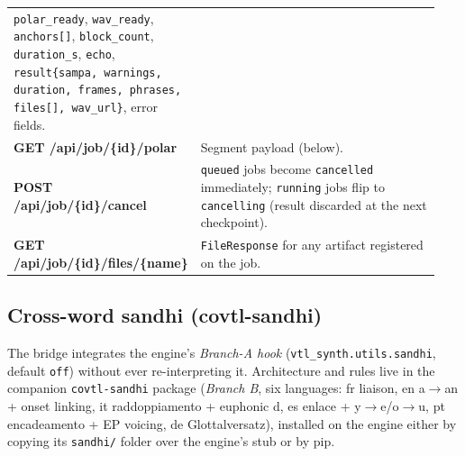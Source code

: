\documentclass[11pt,a4paper]{article}
\begin{document}
\begin{longtable}{p{0.30\linewidth}p{0.64\linewidth}}
\texttt{polar\_ready}, \texttt{wav\_ready}, \texttt{anchors[]},
\texttt{block\_count}, \texttt{duration\_s}, \texttt{echo},
\texttt{result\{sampa, warnings, duration, frames, phrases, files[],
wav\_url\}}, error fields. \\
\textbf{GET /api/job/\{id\}/polar} & Segment payload (below). \\
\textbf{POST /api/job/\{id\}/cancel} & \texttt{queued} jobs become
\texttt{cancelled} immediately; \texttt{running} jobs flip to
\texttt{cancelling} (result discarded at the next checkpoint). \\
\textbf{GET /api/job/\{id\}/files/\{name\}} & \texttt{FileResponse} for
any artifact registered on the job. \\
\end{longtable}

\subsection{Cross-word sandhi (covtl-sandhi)}

The bridge integrates the engine's \emph{Branch-A hook}
(\texttt{vtl\_synth.utils.sandhi}, default \texttt{off}) without ever
re-interpreting it. Architecture and rules live in the companion
\texttt{covtl-sandhi} package (\emph{Branch B}, six languages: fr
liaison, en a$\rightarrow$an + onset linking, it raddoppiamento + euphonic
d, es enlace + y$\rightarrow$e/o$\rightarrow$u, pt encadeamento + EP
voicing, de Glottalversatz), installed on the engine either by copying
its \texttt{sandhi/} folder over the engine's stub or by pip.
\end{document}
